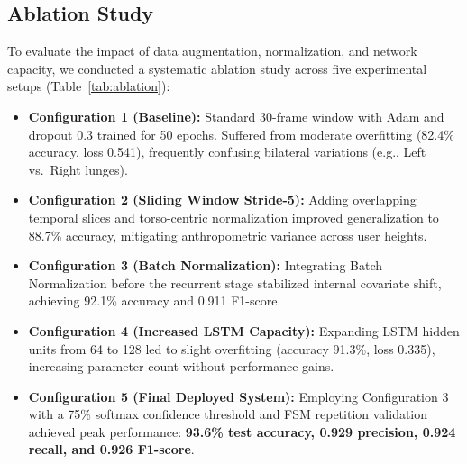 \documentclass[conference]{IEEEtran}
\begin{document}
\begin{table}[!t]
\caption{Performance Across CNN-LSTM Training Configurations}
\label{tab:ablation}
\centering
{}
\end{table}

\subsection{Ablation Study}
To evaluate the impact of data augmentation, normalization, and network capacity, we conducted a systematic ablation study across five experimental setups (Table~\ref{tab:ablation}):
\begin{itemize}
    \item \textbf{Configuration 1 (Baseline):} Standard 30-frame window with Adam and dropout 0.3 trained for 50 epochs. Suffered from moderate overfitting (82.4\% accuracy, loss 0.541), frequently confusing bilateral variations (e.g., Left vs.\ Right lunges).
    \item \textbf{Configuration 2 (Sliding Window Stride-5):} Adding overlapping temporal slices and torso-centric normalization improved generalization to 88.7\% accuracy, mitigating anthropometric variance across user heights.
    \item \textbf{Configuration 3 (Batch Normalization):} Integrating Batch Normalization before the recurrent stage stabilized internal covariate shift, achieving 92.1\% accuracy and 0.911 F1-score.
    \item \textbf{Configuration 4 (Increased LSTM Capacity):} Expanding LSTM hidden units from 64 to 128 led to slight overfitting (accuracy 91.3\%, loss 0.335), increasing parameter count without performance gains.
    \item \textbf{Configuration 5 (Final Deployed System):} Employing Configuration 3 with a 75\% softmax confidence threshold and FSM repetition validation achieved peak performance: \textbf{93.6\% test accuracy, 0.929 precision, 0.924 recall, and 0.926 F1-score}.
\end{itemize}
\end{document}
